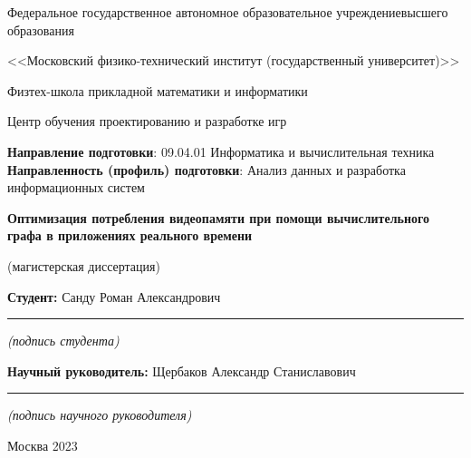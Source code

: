 
\begin{titlepage}
    \begin{center}
    Федеральное государственное автономное образовательное учреждение\break высшего образования\par
    <<Московский физико-технический институт (государственный университет)>>\par
    Физтех-школа прикладной математики и информатики\par
    Центр обучения проектированию и разработке игр\par
    \end{center}
%
    {\bf Направление подготовки}: 09.04.01 Информатика и вычислительная техника\newline
    {\bf Направленность (профиль) подготовки}: Анализ данных и разработка информационных систем\par
%
    {
    \vspace*{\fill}
    \begin{center}
        {\bf\LARGE Оптимизация потребления видеопамяти
        \break при помощи вычислительного графа
        \break в приложениях реального времени}\par
        (магистерская диссертация)
    \end{center}
    \vspace*{\fill}
    }
%
    \hfill
    \begin{minipage}[t]{7cm}
    {\bf Студент: \newline}
    Санду Роман Александрович\newline
    \vspace{-3mm}
    \rule{7cm}{0.15mm}
    \centerline{\small\it (подпись студента)}\newline
    {\bf Научный руководитель: \newline}
    Щербаков Александр Станиславович\newline
    \vspace{-3mm}
    \rule{7cm}{0.15mm}
    \centerline{\small\it (подпись научного руководителя)}
    \end{minipage}
    \vspace*{\fill}
    \begin{center}
        Москва 2023
    \end{center}
\end{titlepage}

\restoregeometry
